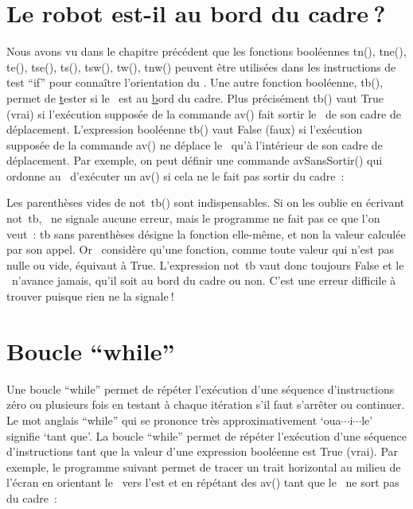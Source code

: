 \section{Le robot est-il au bord du cadre$\:$?}
Nous avons vu dans le chapitre précédent que les fonctions booléennes {\idt tn()}, {\idt tne()}, {\idt te()}, {\idt tse()}, {\idt ts()},
 {\idt tsw()}, {\idt tw()}, {\idt tnw()} peuvent être utilisées dans les instructions
 de test ``if'' pour connaître l'orientation du \robot. Une autre  fonction booléenne,
 {\idt tb()}, permet de \underline{t}ester si
 le \robot\ est au \underline{b}ord du cadre. Plus précisément {\idt tb()} vaut {\mcl True} (vrai)
 si l'exécution supposée de la  commande {\idt av()} fait sortir
 le \robot\ de son cadre de déplacement.  L'expression booléenne
 {\idt tb()} vaut {\mcl False} (faux) si l'exécution supposée
 de la  commande {\idt av()} ne déplace le \robot\ qu'à l'intérieur de son cadre de déplacement.
Par exemple, on peut
 définir une commande {\idt avSansSortir()} qui ordonne au \robot\ d'exécuter un {\idt av()} si cela ne le
 fait pas sortir du cadre~:



{\sloppy\noindent Les parenthèses vides de {\mcl not}\ {\idt tb()} sont indispensables.
Si on les oublie en écrivant {\mcl not}\ {\idt tb}, \python\ ne signale aucune erreur,
mais le programme ne fait pas ce que l'on veut~: {\idt tb} sans parenthèses désigne la
fonction elle-même, et non la valeur calculée par son appel. Or \python\ considère
qu'une fonction, comme toute valeur qui n'est pas nulle ou vide, équivaut à {\mcl True}.
L'expression {\mcl not}\ {\idt tb} vaut donc toujours {\mcl False} et le \robot\
n'avance jamais, qu'il soit au bord du cadre ou non. C'est une erreur difficile à trouver
puisque rien ne la signale$\:$!\par}

\section{Boucle ``while''}

 Une boucle ``while'' permet de répéter l'exécution d'une séquence d'ins\-truc\-tions zéro
ou plusieurs fois en testant à chaque itération s'il faut s'arrêter ou continuer. Le mot anglais
``while'' qui se prononce très approximativement `oua$\cdots$i$\cdots$le' signifie `tant que'. La boucle ``while'' permet de
répéter l'exécution d'une séquence d'instructions tant que la valeur d'une expression booléenne
est {\mcl True} (vrai). Par exemple, le programme suivant permet de tracer un trait horizontal au milieu
de l'écran en orientant le \robot\ vers l'est et en répétant des {\idt av()} tant que le \robot\ ne sort
pas du cadre~:

